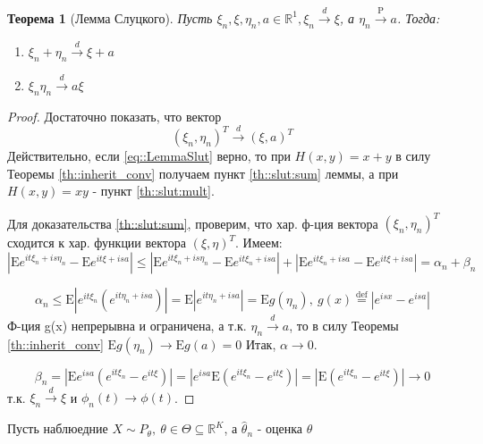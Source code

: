 \documentclass[12pt]{article}
\theoremstyle{basic_theorem}
\theoremstyle{name_theorem}
\newtheorem*{named_theorem}{Теорема}
\newcommand*{\defeq}{\stackrel{\text{def}}{=}}
\def\R{ \mathbb{R} }
\def\E{ \mathrm{E} }
\def\P{ \mathrm{P} }
\begin{document}
\begin{named_theorem}[Лемма Слуцкого]
\label{th::slut}
    Пусть \(\xi_n, \xi, \eta_n, a \in \R^1, \xi_n \xrightarrow{d} \xi\), а \(\eta_n \xrightarrow{\P} a\).
    Тогда:
    \begin{enumerate}
        \item \label{th::slut:sum} \(\xi_n + \eta_n \xrightarrow{d} \xi + a\)
        \item \label{th::slut:mult} \(\xi_n \eta_n \xrightarrow{d} a\xi\)
    \end{enumerate}
\end{named_theorem}
\begin{proof}
    Достаточно показать, что вектор
    \begin{equation} \label{eq::LemmaSlut}
        (\xi_n, \eta_n)^T \xrightarrow{d} (\xi, a)^T
    \end{equation}
    Действительно, если \eqref{eq::LemmaSlut} верно, то при \(H(x, y) = x + y\) в силу Теоремы \ref{th::inherit_conv} получаем пункт \ref{th::slut:sum} леммы,
    а при \(H(x, y) = xy\) -  пункт \ref{th::slut:mult}.

    Для доказательства \ref{th::slut:sum}, проверим, что хар. ф-ция
    вектора \((\xi_n, \eta_n)^T\) сходится к хар. функции вектора \((\xi, \eta)^T\).
    Имеем:
    \[\left\lvert\E e^{it\xi_n + is\eta_n} - \E e^{it\xi + isa}\right\rvert \leq \left\lvert \E e^{it\xi_n + is\eta_n} - \E e^{it\xi_n + isa}\right\rvert + \left\lvert \E e^{it\xi_n + isa} - \E e^{it\xi + isa}\right\rvert = \alpha_n + \beta_n\]

    \[\alpha_n \leq \E \left\lvert e^{it\xi_n}(e^{it\eta_n + isa}) \right\rvert  = \E \left\lvert e^{it\eta_n + isa} \right\rvert  = \E g(\eta_n), \ g(x)\defeq\left\lvert e^{isx} - e^{isa} \right\rvert \]
    Ф-ция g(x) непрерывна и ограничена, а т.к. \(\eta_n \xrightarrow{d} a\),
    то в силу Теоремы \ref{th::inherit_conv} \(\E g(\eta_n) \rightarrow \E g(a) = 0\)
    Итак, \(\alpha \rightarrow 0\).

    \[\beta_n = \left\lvert \E e^{isa}(e^{it\xi_n} - e^{it\xi}) \right\rvert  = \left\lvert e^{isa} \E (e^{it\xi_n} - e^{it\xi}) \right\rvert  = \left\lvert \E (e^{it\xi_n} - e^{it\xi}) \right\rvert  \rightarrow 0\]
    т.к. \(\xi_n \xrightarrow{d} \xi\) и \(\phi_n(t) \rightarrow \phi(t)\).
\end{proof}

Пусть наблюедние \(X \sim  P_{\theta},\ \theta \in \Theta \subseteq \R^{K}\), а \(\widehat{\theta}_n\) - оценка \(\theta\)
\end{document}
